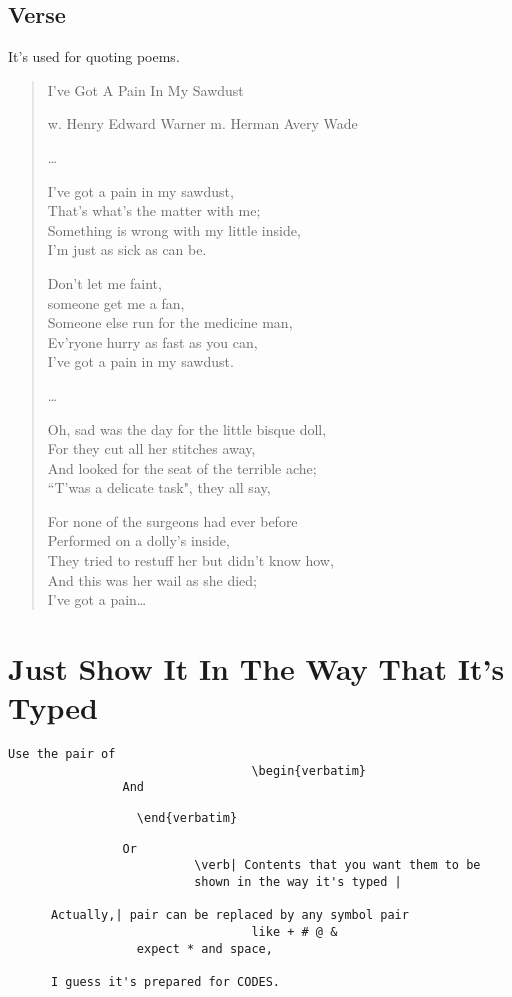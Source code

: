 \documentclass[a4paper]{report}
\begin{document}
\subsection{Verse}
It's used for quoting poems.

\begin{verse}
\begin{center}
I've Got A Pain In My Sawdust

w. Henry Edward Warner m. Herman Avery Wade
\end{center}

\ldots

I've got a pain in my sawdust, \\
That's what's the matter with me;\\
Something is wrong with my little inside,\\
I'm just as sick as can be.

Don't let me faint, \\
someone get me a fan,\\
Someone else run for the medicine man,\\
Ev'ryone hurry as fast as you can,\\
I've got a pain in my sawdust.

\ldots

Oh, sad was the day for the little bisque doll,\\
For they cut all her stitches away,\\
And looked for the seat of the terrible ache;\\
``T'was a delicate task", they all say,

For none of the surgeons had ever before\\
Performed on a dolly's inside,\\
They tried to restuff her but didn't know how,\\
And this was her wail as she died;\\
I've got a pain\ldots
\end{verse}

\section{Just Show It In The Way That It's Typed}
\begin{verbatim}
Use the pair of
                                  \begin{verbatim}
                And
\end{verbatim}
\verb|                  \end{verbatim}|
\begin{verbatim}
                Or
                          \verb| Contents that you want them to be
                          shown in the way it's typed |

      Actually,| pair can be replaced by any symbol pair
                                  like + # @ &
                  expect * and space,

      I guess it's prepared for CODES.
\end{verbatim}
\end{document}

